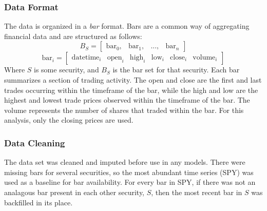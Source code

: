 \documentclass{article}
\begin{document}
\subsubsection{Data Format}
The data is organized in a \textit{bar} format.
Bars are a common way of aggregating financial data and are structured as follows:
$$B_{S} = \begin{bmatrix} \mathrm{bar}_0, & \mathrm{bar}_1, & 
    ..., & \mathrm{bar}_n \end{bmatrix}$$
$$\mathrm{bar}_i = \begin{bmatrix} \mathrm{datetime}_i & \mathrm{open}_i & 
    \mathrm{high}_i & \mathrm{low}_i & \mathrm{close}_i & \mathrm{volume}_i 
\end{bmatrix}$$
Where $S$ is some security, and $B_S$ is the bar set for that security. Each bar summarizes
a section of trading activity. The open and close are the first and last trades occurring within
the timeframe of the bar, while the high and low are the highest and lowest trade prices 
observed within the timeframe of the bar. The volume represents the number of shares that
traded within the bar. For this analysis, only the closing prices are used.
\subsubsection{Data Cleaning}
The data set was cleaned and imputed before use in any models. There were missing bars 
for several securities, so the most abundant time series (SPY) was used as a baseline for 
bar availability. For every bar in SPY, if there was not an analagous bar present in each 
other security, $S$, then the most recent bar in $S$ was backfilled in its place. 
\end{document}
